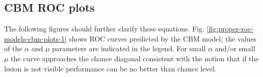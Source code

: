 \documentclass[
]{book}
\newenvironment{Shaded}{\begin{snugshade}}{\end{snugshade}}
\newcommand{\CommentTok}[1]{\textcolor[rgb]{0.56,0.35,0.01}{\textit{#1}}}
\newcommand{\DataTypeTok}[1]{\textcolor[rgb]{0.13,0.29,0.53}{#1}}
\newcommand{\DecValTok}[1]{\textcolor[rgb]{0.00,0.00,0.81}{#1}}
\newcommand{\KeywordTok}[1]{\textcolor[rgb]{0.13,0.29,0.53}{\textbf{#1}}}
\newcommand{\NormalTok}[1]{#1}
\newcommand{\OperatorTok}[1]{\textcolor[rgb]{0.81,0.36,0.00}{\textbf{#1}}}
\newcommand{\StringTok}[1]{\textcolor[rgb]{0.31,0.60,0.02}{#1}}
\begin{document}
\begin{Shaded}
\end{Shaded}

\hypertarget{proper-roc-models-cbm-rocs}{%
\subsection{CBM ROC plots}\label{proper-roc-models-cbm-rocs}}

The following figures should further clarify these equations. Fig. \ref{fig:proper-roc-models-cbm-plots-1} shows ROC curves predicted by the CBM model; the values of the \(\alpha\) and \(\mu\) parameters are indicated in the legend. For small \(\alpha\) and/or small \(\mu\) the curve approaches the chance diagonal consistent with the notion that if the lesion is not visible performance can be no better than chance level.
\end{document}
